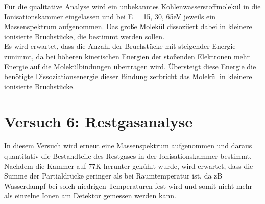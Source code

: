 Für die qualitative Analyse wird ein unbekanntes Kohlenwasserstoffmolekül in die Ionisationskammer eingelassen und bei E = {15, 30, 65}\;eV jeweils ein Massenspektrum aufgenommen.
Das große Molekül dissoziiert dabei in kleinere ionisierte Bruchstücke, die bestimmt werden sollen.\\
Es wird erwartet, dass die Anzahl der Bruchstücke mit steigender Energie zunimmt, da bei höheren kinetischen Energien der stoßenden Elektronen mehr Energie auf die Molekülbindungen übertragen wird. 
Übersteigt diese Energie die benötigte Dissoziationsenergie dieser Bindung zerbricht das Molekül in kleinere ionisierte Bruchstücke.

\section{Versuch 6: Restgasanalyse}

In diesem Versuch wird erneut eine Massenspektrum aufgenommen und daraus quantitativ die Bestandteile des Restgases in der Ionisationskammer bestimmt.
Nachdem die Kammer auf 77\;K herunter gekühlt wurde, wird erwartet, dass die Summe der Partialdrücke geringer als bei Raumtemperatur ist, da zB Wasserdampf bei solch niedrigen Temperaturen fest wird und somit nicht mehr als einzelne Ionen am Detektor gemessen werden kann.